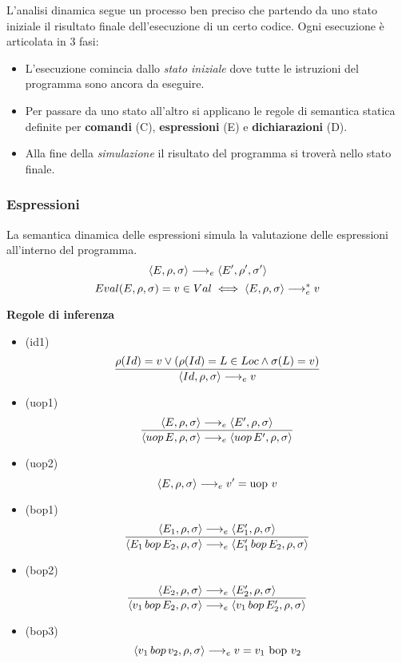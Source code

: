 \documentclass{article}
\begin{document}
L'analisi dinamica segue un processo ben preciso che partendo da uno stato iniziale   il risultato finale dell'esecuzione di un certo codice. Ogni esecuzione è articolata in 3 fasi:
\begin{itemize}
    \item L'esecuzione comincia dallo \emph{stato iniziale} dove tutte le istruzioni del programma sono ancora da eseguire.
    \item Per passare da uno stato all'altro si applicano le regole di semantica statica definite per \textbf{comandi} (C), \textbf{espressioni} (E) e \textbf{dichiarazioni} (D).
    \item Alla fine della \emph{simulazione} il risultato del programma si troverà nello stato finale.
\end{itemize}

\subsubsection{Espressioni}
La semantica dinamica delle espressioni simula la valutazione delle espressioni all'interno del programma.
\[\langle E,\rho,\sigma \rangle \longrightarrow_e \langle E',\rho',\sigma' \rangle\]
\[Eval(E,\rho,\sigma) = v \in Val \iff \langle E,\rho,\sigma \rangle \longrightarrow_e^* v\]

\noindent\textbf{Regole di inferenza}
\begin{itemize}
    \item (id1)
          \[\frac
              {\rho(Id) = v \lor (\rho(Id) = L \in Loc \land \sigma(L) = v)}
              {\langle Id,\rho,\sigma \rangle \longrightarrow_e v}\]

    \item (uop1)
          \[\frac
              {\langle E,\rho,\sigma \rangle \longrightarrow_e \langle E',\rho,\sigma \rangle}
              {\langle uop\,E,\rho,\sigma \rangle \longrightarrow_e \langle uop\,E',\rho,\sigma \rangle}\]
    \item (uop2)
          \[\langle E,\rho,\sigma \rangle \longrightarrow_e v' = \text{uop } v\]

    \item (bop1)
          \[\frac
              {\langle E_1,\rho,\sigma \rangle \longrightarrow_e \langle E_1',\rho,\sigma \rangle}
              {\langle E_1 \,bop\, E_2,\rho,\sigma \rangle \longrightarrow_e \langle E_1'\,bop\,E_2,\rho,\sigma \rangle}\]
    \item (bop2)
          \[\frac
              {\langle E_2,\rho,\sigma \rangle \longrightarrow_e \langle E_2',\rho,\sigma \rangle}
              {\langle v_1\,bop\,E_2,\rho,\sigma \rangle \longrightarrow_e \langle v_1\,bop\,E_2',\rho,\sigma \rangle}\]
    \item (bop3)
          \[\langle v_1\,bop\,v_2,\rho,\sigma \rangle \longrightarrow_e v = v_1 \text{ bop } v_2\]

\end{itemize}
\end{document}
